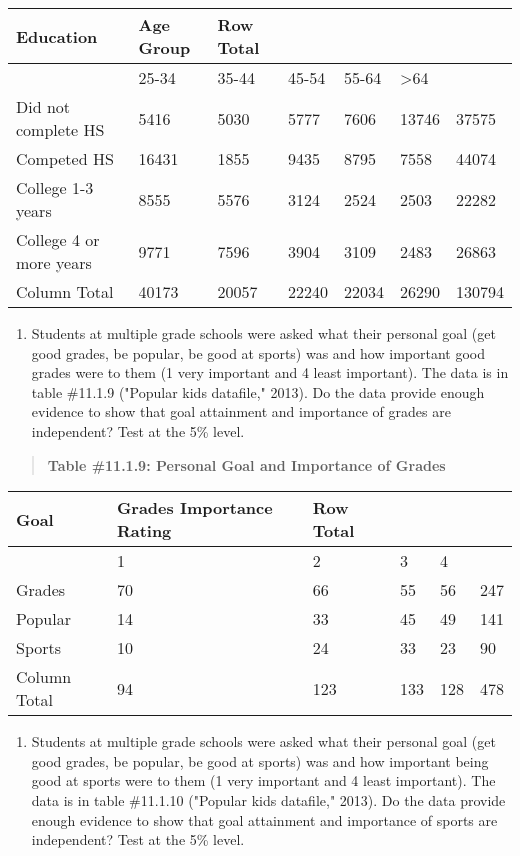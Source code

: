 \documentclass[]{book}
\providecommand{\tightlist}{%
  \setlength{\itemsep}{0pt}\setlength{\parskip}{0pt}}
\begin{document}
\begin{longtable}[]{@{}lllllll@{}}
\toprule
Education & Age Group & Row Total & & & &\tabularnewline
\midrule
\endhead
& 25-34 & 35-44 & 45-54 & 55-64 & \textgreater{}64 &\tabularnewline
Did not complete HS & 5416 & 5030 & 5777 & 7606 & 13746 & 37575\tabularnewline
Competed HS & 16431 & 1855 & 9435 & 8795 & 7558 & 44074\tabularnewline
College 1-3 years & 8555 & 5576 & 3124 & 2524 & 2503 & 22282\tabularnewline
College 4 or more years & 9771 & 7596 & 3904 & 3109 & 2483 & 26863\tabularnewline
Column Total & 40173 & 20057 & 22240 & 22034 & 26290 & 130794\tabularnewline
\bottomrule
\end{longtable}

\begin{enumerate}
\def\labelenumi{\arabic{enumi}.}
\setcounter{enumi}{4}
\tightlist
\item
  Students at multiple grade schools were asked what their personal goal (get good grades, be popular, be good at sports) was and how important good grades were to them (1 very important and 4 least important). The data is in table \#11.1.9 ("Popular kids datafile," 2013). Do the data provide enough evidence to show that goal attainment and importance of grades are independent? Test at the 5\% level.
\end{enumerate}

\begin{quote}
\textbf{Table \#11.1.9: Personal Goal and Importance of Grades}
\end{quote}

\begin{longtable}[]{@{}llllll@{}}
\toprule
Goal & Grades Importance Rating & Row Total & & &\tabularnewline
\midrule
\endhead
& 1 & 2 & 3 & 4 &\tabularnewline
Grades & 70 & 66 & 55 & 56 & 247\tabularnewline
Popular & 14 & 33 & 45 & 49 & 141\tabularnewline
Sports & 10 & 24 & 33 & 23 & 90\tabularnewline
Column Total & 94 & 123 & 133 & 128 & 478\tabularnewline
\bottomrule
\end{longtable}

\begin{enumerate}
\def\labelenumi{\arabic{enumi}.}
\setcounter{enumi}{5}
\tightlist
\item
  Students at multiple grade schools were asked what their personal goal (get good grades, be popular, be good at sports) was and how important being good at sports were to them (1 very important and 4 least important). The data is in table \#11.1.10 ("Popular kids datafile," 2013). Do the data provide enough evidence to show that goal attainment and importance of sports are independent? Test at the 5\% level.
\end{enumerate}
\end{document}
